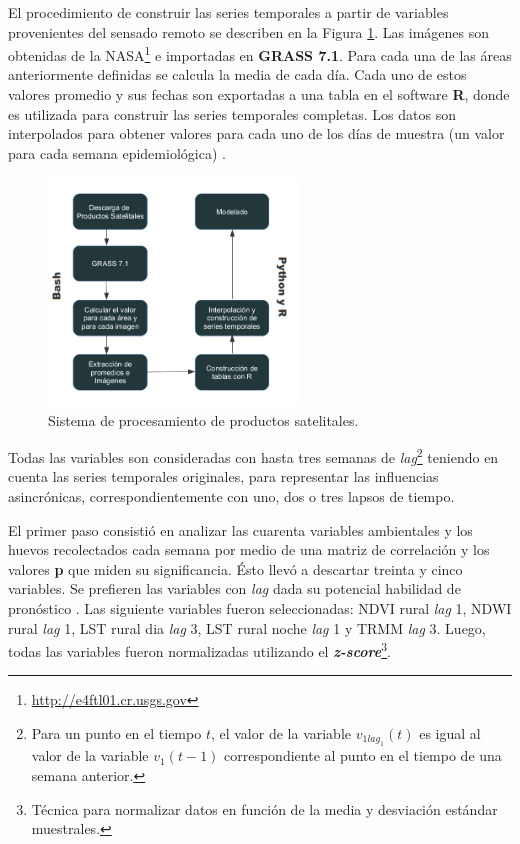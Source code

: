   \par El procedimiento de construir las series temporales a partir de variables
    provenientes del sensado remoto se describen en la Figura \ref{fig:sistema}.
    Las imágenes son obtenidas de la NASA\footnote{\url{http://e4ftl01.cr.usgs.gov}} e
    importadas en \textbf{GRASS 7.1}. Para cada una de las áreas anteriormente
    definidas se calcula la media de cada día. Cada uno de estos valores
    promedio y sus fechas son exportadas a una tabla en el software \textbf{R}\cite{r_language},
    donde es utilizada para construir las series temporales completas.
    Los datos son interpolados para obtener valores para cada uno de los
    días de muestra (un valor para cada semana epidemiológica) \cite{german_temporal}.
    \begin{figure}[hbt]
    \centering%
    \includegraphics[width=0.6\textwidth]{images/sistema}%
    \caption{Sistema de procesamiento de productos satelitales.}\label{fig:sistema}
    \end{figure}

  \par Todas las variables son consideradas con hasta tres semanas de
  \textit{lag}\footnote{Para un punto en el tiempo $t$, el valor de la variable
  $v_{1 lag_{1}}(t)$ es igual al valor de la variable $v_{1}(t-1)$ correspondiente
  al punto en el tiempo de una semana anterior.}
    teniendo en cuenta las series temporales originales, para representar las
    influencias asincrónicas, correspondientemente con uno, dos o tres
    lapsos de tiempo.

  \par El primer paso consistió en analizar las cuarenta variables ambientales
    y los huevos recolectados cada semana por medio de una matriz de correlación
    y los valores \textbf{p} que miden su significancia. Ésto llevó a descartar
    treinta y cinco variables. Se prefieren las variables con \textit{lag} dada
    su potencial habilidad de pronóstico \cite{german_temporal}. Las siguiente
    variables fueron seleccionadas: NDVI rural \textit{lag} 1,
    NDWI rural \textit{lag} 1, LST rural dia \textit{lag} 3,
    LST rural noche \textit{lag} 1 y TRMM \textit{lag} 3.
    Luego, todas las variables fueron normalizadas utilizando el
    \textbf{\textit{z-score}}\footnote{Técnica para normalizar datos en función de
    la media y desviación estándar muestrales.}.

